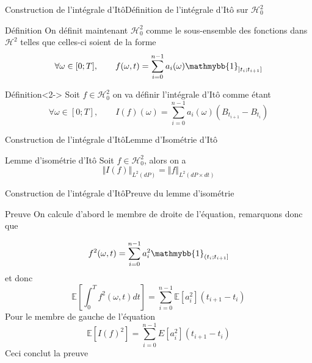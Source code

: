 \documentclass{beamer}
\newcommand{\1}{\mathmybb{1}}
\begin{document}
 \begin{frame}{Construction de l'intégrale d'Itô}{Définition de l'intégrale d'Itô sur $\mathcal{H}^2_0$}
      \begin{block}{Définition}
     On définit maintenant $\mathcal{H}^{2}_{0}$ comme le sous-ensemble des fonctions dans $\mathcal{H}^{2}$ telles que celles-ci soient de la forme 
     \[
       \forall \omega \in [0; T], \qquad f(\omega, t) = \sum_{i=0}^{n-1}a_{i}(\omega) \1_{\left] t_{i} ; t_{i+1} \right] }
     \]
     \end{block}
     \begin{block}{Définition}<2->
       Soit $ f \in \mathcal{H}^{2}_{0} $ on va définir l'intégrale d'Itô comme étant
       \[
         \forall \omega \in [0; T], \qquad I(f)(\omega) = \sum_{i=0}^{n-1} a_{i}(\omega)\left( B_{t_{i+1}} - B_{t_{i}} \right)
       \]
     \end{block}
   \end{frame}
   \begin{frame}{Construction de l'intégrale d'Itô}{Lemme d'Isométrie d'Itô}
     \begin{block}{Lemme d'isométrie d'Itô}
       Soit $f \in \mathcal{H}_{0}^{2}$, alors on a
       \[
         \Vert I(f) \Vert_{L^{2}(dP)} = \Vert f \Vert_{L^{2}(dP \times dt)}
       \]
     \end{block}
     \end{frame}
     \begin{frame}{Construction de l'intégrale d'Itô}{Preuve du lemme d'isométrie}
     \begin{block}{Preuve}
       On calcule d'abord le membre de droite de l'équation, remarquons donc que

       \[
       f ^{2}(\omega, t) = \sum_{i=0}^{n-1}a^{2}_{i} \1 _{\left( t_{i} ; t_{i+1} \right]}
     \]
     et donc
     \[
       \mathbb{E} \left[ \int_{0}^{T} f^{2} (\omega, t) dt \right] = \sum_{i=0}^{n-1} \mathbb{E}\left[  a^{2}_{i}\right] (t_{i+1} - t_i)
     \]
     Pour le membre de gauche de l'équation
     \[
       \mathbb{E}\left[ I(f)^{2} \right] = \sum_{i=0}^{n-1} E \left[a^{2}_{i}\right] (t_{i+1} - t_{i})
     \]
     Ceci conclut la preuve
       \end{block}
     \end{frame}
\end{document}
